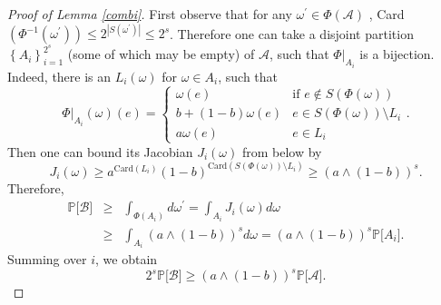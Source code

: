 \documentclass[12pt, twoside,a4paper,reqno]{amsart}
\theoremstyle{plain}
\theoremstyle{remark}
\theoremstyle{definition}
\begin{document}
\begin{proof}[Proof of Lemma \ref{combi}]
First observe that for any $\omega ^{\prime }\in \Phi \left( \mathcal{A}\right) $%
, Card$\left( \Phi ^{-1}\left( \omega ^{\prime }\right) \right) \leq
2^{\left\vert S\left( \omega ^{\prime }\right) \right\vert }\leq 2^{s}$.
Therefore one can take a disjoint partition $\left\{ A_{i}\right\}
_{i=1}^{2^{s}}$ (some of which may be empty) of $\mathcal{A}$, such that $%
\Phi |_{A_{i}}$ is a bijection. Indeed, there is an $L_{i}(\omega)$ for $\omega \in A_{i}$, such that %
\begin{equation*}
\Phi |_{A_{i}}\left( \omega \right) \left( e\right) =\left\{
\begin{array}{cc}
\omega \left( e\right)  & \text{if }e\notin S\left( \Phi \left( \omega
\right) \right)  \\
b+\left( 1-b\right) \omega \left( e\right)  & e\in S\left( \Phi \left(
\omega \right) \right) \setminus L_{i} \\
a\omega \left( e\right)  & e\in L_{i}%
\end{array}%
\right. .
\end{equation*}%
Then one can bound its Jacobian $J_{i}(\omega)$ from below by%
\begin{equation*}
J_{i}(\omega) \geq a^{\text{Card}\left( L_{i}\right)
}\left( 1-b\right) ^{\text{Card}(S\left( \Phi \left( \omega \right) \right)
\setminus L_{i})}\geq \left( a\wedge \left( 1-b\right) \right) ^{s}.
\end{equation*}%
Therefore,%
\begin{eqnarray*}
\mathbb{P}[\mathcal{B]} &\geq &\int_{\Phi \left( A_{i}\right) }d\omega
^{\prime }=\int_{A_{i}}J_{i}(\omega)  d\omega  \\
&\geq &\int_{A_{i}}\left( a\wedge \left( 1-b\right) \right) ^{s}d\omega
=\left( a\wedge \left( 1-b\right) \right) ^{s}\mathbb{P[}A_{i}].
\end{eqnarray*}%
Summing over $i$, we obtain
\begin{equation*}
2^{s}\mathbb{P}[\mathcal{B]}\geq \left( a\wedge \left( 1-b\right) \right)
^{s}\mathbb{P}[\mathcal{A]}.
\end{equation*}
\end{proof}
\end{document}
